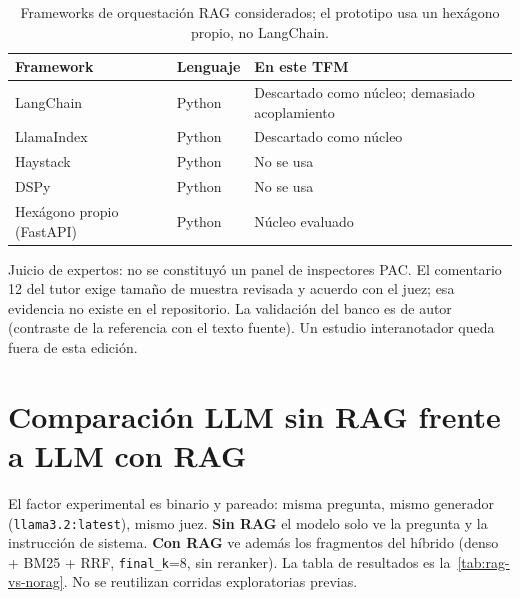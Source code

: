 \begin{table}[htbp]
\centering
\caption{Frameworks de orquestación RAG considerados; el prototipo usa un hexágono propio, no LangChain.}
\label{tab:frameworks}
\begin{tabular}{lll}
\toprule
\textbf{Framework} & \textbf{Lenguaje} & \textbf{En este TFM} \\
\midrule
LangChain & Python & Descartado como núcleo; demasiado acoplamiento \\
LlamaIndex & Python & Descartado como núcleo \\
Haystack & Python & No se usa \\
DSPy & Python & No se usa \\
Hexágono propio (FastAPI) & Python & Núcleo evaluado \\
\bottomrule
\end{tabular}
\end{table}

Juicio de expertos: no se constituyó un panel de inspectores PAC. El comentario 12 del tutor exige tamaño de muestra revisada y acuerdo con el juez; esa evidencia no existe en el repositorio. La validación del banco es de autor (contraste de la referencia con el texto fuente). Un estudio interanotador queda fuera de esta edición.

\section{Comparación LLM sin RAG frente a LLM con RAG}
El factor experimental es binario y pareado: misma pregunta, mismo generador (\texttt{llama3.2:latest}), mismo juez. \textbf{Sin RAG} el modelo solo ve la pregunta y la instrucción de sistema. \textbf{Con RAG} ve además los fragmentos del híbrido (denso + BM25 + RRF, \texttt{final\_k}=8, sin reranker). La tabla de resultados es la~\ref{tab:rag-vs-norag}. No se reutilizan corridas exploratorias previas.


